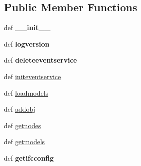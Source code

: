 \subsection*{Public Member Functions}
\begin{DoxyCompactItemize}
\item 
\hypertarget{classcore_1_1emane_1_1emane_1_1_emane_a73027a37efe2e7b42bf35e850e6a08f5}{def {\bfseries \+\_\+\+\_\+init\+\_\+\+\_\+}}\label{classcore_1_1emane_1_1emane_1_1_emane_a73027a37efe2e7b42bf35e850e6a08f5}

\item 
\hypertarget{classcore_1_1emane_1_1emane_1_1_emane_a236e69ad99a53d13672ed89b60fa3f38}{def {\bfseries logversion}}\label{classcore_1_1emane_1_1emane_1_1_emane_a236e69ad99a53d13672ed89b60fa3f38}

\item 
\hypertarget{classcore_1_1emane_1_1emane_1_1_emane_ac244047aaca6403ce58db2da607d8ae8}{def {\bfseries deleteeventservice}}\label{classcore_1_1emane_1_1emane_1_1_emane_ac244047aaca6403ce58db2da607d8ae8}

\item 
def \hyperlink{classcore_1_1emane_1_1emane_1_1_emane_aebb15ef0ea662269f49e55f7e6bbe6fd}{initeventservice}
\item 
def \hyperlink{classcore_1_1emane_1_1emane_1_1_emane_a05a9d7b8e6d0bb1682e001501116fa3d}{loadmodels}
\item 
def \hyperlink{classcore_1_1emane_1_1emane_1_1_emane_a4835a319968525a390b4f99a126339af}{addobj}
\item 
def \hyperlink{classcore_1_1emane_1_1emane_1_1_emane_a4dc04cb4a5c8a3e007b6f320c3a49c5e}{getnodes}
\item 
def \hyperlink{classcore_1_1emane_1_1emane_1_1_emane_a279b91fff4fa44744c3b6a1cb2e716c2}{getmodels}
\item 
\hypertarget{classcore_1_1emane_1_1emane_1_1_emane_a8dd95ac9b85d1442ae3cb4516ccf8cd4}{def {\bfseries getifcconfig}}\label{classcore_1_1emane_1_1emane_1_1_emane_a8dd95ac9b85d1442ae3cb4516ccf8cd4}


\end{DoxyCompactItemize}
